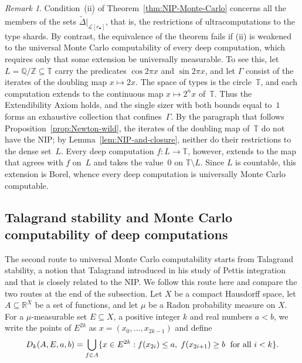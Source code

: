 \documentclass[psamsfonts]{amsart}
\theoremstyle{definition}
\theoremstyle{remark}
\newtheorem{rem}[thm]{Remark}
\numberwithin{equation}{section}
\begin{document}
\begin{rem}\label{rem:doubling-rationals}
Condition~(ii) of Theorem~\ref{thm:NIP-Monte-Carlo} concerns all the members of the sets $\overline{\tilde\Delta|_{\mathcal{L}[r_\bullet]}}$, that is, the restrictions of ultracomputations to the type shards.
By contrast, the equivalence of the theorem fails if (ii) is weakened to the universal Monte Carlo computability of every deep computation, which requires only that some extension be universally measurable.
To see this, let $L=\mathbb{Q}/\mathbb{Z}\subseteq\mathbb{T}$ carry the predicates $\cos2\pi x$ and $\sin2\pi x$, and let $\Gamma$ consist of the iterates of the doubling map $x\mapsto2x$.
The space of types is the circle~$\mathbb{T}$, and each computation extends to the continuous map $x\mapsto2^nx$ of~$\mathbb{T}$.
Thus the Extendibility Axiom holds, and the single sizer with both bounds equal to~$1$ forms an exhaustive collection that confines~$\Gamma$.
By the paragraph that follows Proposition~\ref{prop:Newton-wild}, the iterates of the doubling map of~$\mathbb{T}$ do not have the NIP;
by Lemma~\ref{lem:NIP-and-closure}, neither do their restrictions to the dense set~$L$.
Every deep computation $f\colon L\to\mathbb{T}$, however, extends to the map that agrees with $f$ on~$L$ and takes the value~$0$ on $\mathbb{T}\setminus L$.
Since $L$ is countable, this extension is Borel, whence every deep computation is universally Monte Carlo computable.
\end{rem}

\subsection{Talagrand stability and Monte Carlo computability of deep computations}

The second route to universal Monte Carlo computability starts from Talagrand stability, a notion that Talagrand introduced in his study of Pettis integration~\cite{talagrand1984pettis} and that is closely related to the NIP.
We follow this route here and compare the two routes at the end of the subsection.
Let $X$ be a compact Hausdorff space, let $A\subseteq \mathbb{R}^X$ be a set of functions, and let $\mu$ be a Radon probability measure on $X$.
For a $\mu$-measurable set $E\subseteq X$, a positive integer $k$ and real numbers $a<b$, we write the points of $E^{2k}$ as $x=(x_0,\dots,x_{2k-1})$ and define
\[
  D_k(A,E,a,b)=\bigcup_{f\in A}\{x\in E^{2k}:f(x_{2i})\leq a, \hspace{1mm} f(x_{2i+1})\geq b \hspace{1mm}{\text{ for all }i<k} \}.
\]
\end{document}
